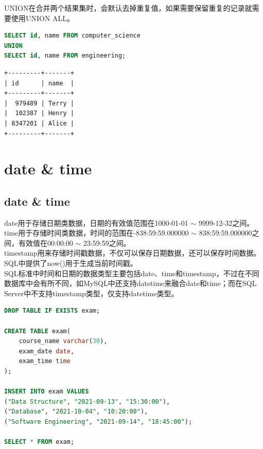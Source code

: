 \documentclass[12pt, openany, oneside]{book}
\begin{document}
UNION在合并两个结果集时，会默认去掉重复值，如果需要保留重复的记录就需要使用UNION ALL。\\


\begin{lstlisting}[language=SQL]
SELECT id, name FROM computer_science
UNION
SELECT id, name FROM engineering;
\end{lstlisting}

\begin{tcolorbox}
	\begin{verbatim}
+---------+-------+
| id      | name  |
+---------+-------+
|  979489 | Terry |
|  102387 | Henry |
| 8347201 | Alice |
+---------+-------+
\end{verbatim}
\end{tcolorbox}

\newpage

\chapter{date \& time}

\section{date \& time}

date用于存储日期类数据，日期的有效值范围在1000-01-01 $ \sim $ 9999-12-32之间。\\

time用于存储时间类数据，时间的范围在-838:59:59.000000 $ \sim $ 838:59:59.000000之间，有效值在00:00:00 $ \sim $ 23:59:59之间。\\

timestamp用来存储时间戳数据，不仅可以保存日期数据，还可以保存时间数据。SQL中提供了now()用于生成当前时间戳。\\

SQL标准中时间和日期的数据类型主要包括date、time和timestamp，不过在不同数据库中会有所不同，如MySQL中还支持datetime来融合date和time；而在SQL Server中不支持timestamp类型，仅支持datetime类型。\\


\begin{lstlisting}[language=SQL]
DROP TABLE IF EXISTS exam;

CREATE TABLE exam(
	course_name varchar(30),
	exam_date date,
	exam_time time
);

INSERT INTO exam VALUES
("Data Structure", "2021-09-13", "15:30:00"),
("Database", "2021-10-04", "10:20:00"),
("Software Engineering", "2021-09-14", "18:45:00");

SELECT * FROM exam;
\end{lstlisting}
\end{document}
